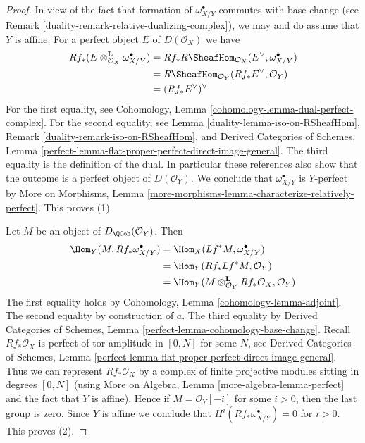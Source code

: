 \begin{proof}

In view of the fact that formation of $\omega_{X/Y}^\bullet$ commutes
with base change (see Remark \ref{duality-remark-relative-dualizing-complex}),
we may and do assume that $Y$ is affine. For a perfect object $E$ of
$D(\mathcal{O}_X)$ we have
\begin{align*}
Rf_*(E \otimes_{\mathcal{O}_X}^\mathbf{L} \omega_{X/Y}^\bullet)
& =
Rf_*R\SheafHom_{\mathcal{O}_X}(E^\vee, \omega_{X/Y}^\bullet) \\
& =
R\SheafHom_{\mathcal{O}_Y}(Rf_*E^\vee, \mathcal{O}_Y) \\
& =
(Rf_*E^\vee)^\vee
\end{align*}
For the first equality, see
Cohomology, Lemma \ref{cohomology-lemma-dual-perfect-complex}.
For the second equality, see Lemma \ref{duality-lemma-iso-on-RSheafHom},
Remark \ref{duality-remark-iso-on-RSheafHom}, and
Derived Categories of Schemes, Lemma
\ref{perfect-lemma-flat-proper-perfect-direct-image-general}.
The third equality is the definition of the dual. In particular
these references also show that the outcome is a perfect object
of $D(\mathcal{O}_Y)$. We conclude that $\omega_{X/Y}^\bullet$
is $Y$-perfect by More on Morphisms, Lemma
\ref{more-morphisms-lemma-characterize-relatively-perfect}.
This proves (1).

\medskip\noindent
Let $M$ be an object of $D_\QCoh(\mathcal{O}_Y)$. Then
\begin{align*}
\Hom_Y(M, Rf_*\omega_{X/Y}^\bullet) & =
\Hom_X(Lf^*M, \omega_{X/Y}^\bullet) \\
& =
\Hom_Y(Rf_*Lf^*M, \mathcal{O}_Y) \\
& =
\Hom_Y(M \otimes_{\mathcal{O}_Y}^\mathbf{L} Rf_*\mathcal{O}_X, \mathcal{O}_Y)
\end{align*}
The first equality holds by Cohomology, Lemma
\ref{cohomology-lemma-adjoint}.
The second equality by construction of $a$.
The third equality by Derived Categories of Schemes, Lemma
\ref{perfect-lemma-cohomology-base-change}.
Recall $Rf_*\mathcal{O}_X$ is perfect of tor amplitude in $[0, N]$
for some $N$, see
Derived Categories of Schemes, Lemma
\ref{perfect-lemma-flat-proper-perfect-direct-image-general}.
Thus we can represent $Rf_*\mathcal{O}_X$ by a complex of
finite projective modules sitting in degrees $[0, N]$
(using More on Algebra, Lemma \ref{more-algebra-lemma-perfect}
and the fact that $Y$ is affine).
Hence if $M = \mathcal{O}_Y[-i]$ for some $i > 0$, then the last
group is zero. Since $Y$ is affine we conclude that
$H^i(Rf_*\omega_{X/Y}^\bullet) = 0$ for $i > 0$.
This proves (2).


\end{proof}
